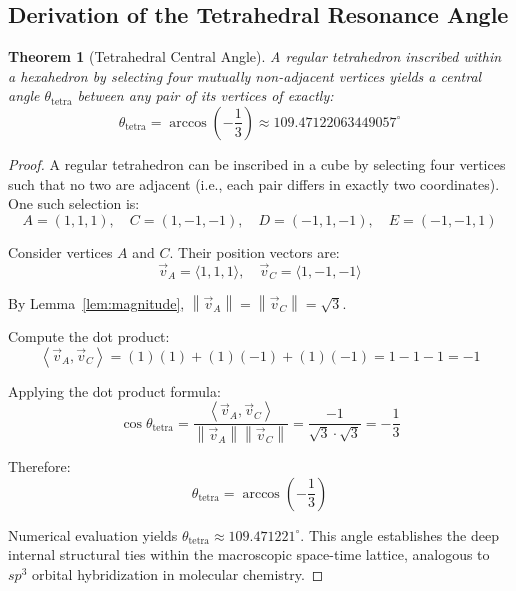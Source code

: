 \documentclass[12pt,a4paper,oneside]{article}
\newtheorem{theorem}{Theorem}[section]
\newcommand{\vecnorm}[1]{\left\|#1\right\|}
\newcommand{\inner}[2]{\left\langle #1, #2 \right\rangle}
\begin{document}
\subsection{Derivation of the Tetrahedral Resonance Angle}

\begin{theorem}[Tetrahedral Central Angle]
\label{thm:tetra}
A regular tetrahedron inscribed within a hexahedron by selecting four mutually non-adjacent vertices yields a central angle $\theta_{\text{tetra}}$ between any pair of its vertices of exactly:
\begin{equation}
    \boxed{\theta_{\text{tetra}} = \arccos\left(-\frac{1}{3}\right) \approx 109.47122063449057^\circ}
\end{equation}
\end{theorem}

\begin{proof}
A regular tetrahedron can be inscribed in a cube by selecting four vertices such that no two are adjacent (i.e., each pair differs in exactly two coordinates). One such selection is:
\begin{equation}
    A = (1, 1, 1), \quad C = (1, -1, -1), \quad D = (-1, 1, -1), \quad E = (-1, -1, 1)
\end{equation}

Consider vertices $A$ and $C$. Their position vectors are:
\begin{equation}
    \vec{v}_A = \langle 1, 1, 1 \rangle, \quad \vec{v}_C = \langle 1, -1, -1 \rangle
\end{equation}

By Lemma~\ref{lem:magnitude}, $\vecnorm{\vec{v}_A} = \vecnorm{\vec{v}_C} = \sqrt{3}$.

Compute the dot product:
\begin{equation}
    \inner{\vec{v}_A}{\vec{v}_C} = (1)(1) + (1)(-1) + (1)(-1) = 1 - 1 - 1 = -1
\end{equation}

Applying the dot product formula:
\begin{equation}
    \cos \theta_{\text{tetra}} = \frac{\inner{\vec{v}_A}{\vec{v}_C}}{\vecnorm{\vec{v}_A} \vecnorm{\vec{v}_C}} = \frac{-1}{\sqrt{3} \cdot \sqrt{3}} = -\frac{1}{3}
\end{equation}

Therefore:
\begin{equation}
    \theta_{\text{tetra}} = \arccos\left(-\frac{1}{3}\right)
\end{equation}

Numerical evaluation yields $\theta_{\text{tetra}} \approx 109.471221^\circ$. This angle establishes the deep internal structural ties within the macroscopic space-time lattice, analogous to $sp^3$ orbital hybridization in molecular chemistry.
\end{proof}
\end{document}

